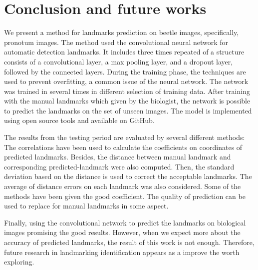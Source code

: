 \documentclass[conference]{IEEEtran}
\begin{document}
\section{Conclusion and future works}
We present a method for landmarks prediction on beetle images, specifically, pronotum images. The method used the convolutional neural network for automatic detection landmarks. It includes three times repeated of a structure consists of a convolutional layer, a max pooling layer, and a dropout layer, followed by the connected layers. During the training phase, the techniques are used to prevent overfitting, a common issue of the neural network. The network was trained in several times in different selection of training data. After training with the manual landmarks which given by the biologist, the network is possible to predict the landmarks on the set of unseen images. The model is implemented using open source tools and available on GitHub.

The results from the testing period are evaluated by several different methods: The correlations have been used to calculate the coefficients on coordinates of predicted landmarks. Besides, the distance between manual landmark and corresponding predicted-landmark were also computed. Then, the standard deviation based on the distance is used to correct the acceptable landmarks. The average of distance errors on each landmark was also considered. Some of the methods have been given the good coefficient. The quality of prediction can be used to replace for manual landmarks in some aspect.

Finally, using the convolutional network to predict the landmarks on biological images promising the good results. However, when we expect more about the accuracy of predicted landmarks, the result of this work is not enough. Therefore, future research in landmarking identification appears as a improve the worth exploring.

\end{document}
